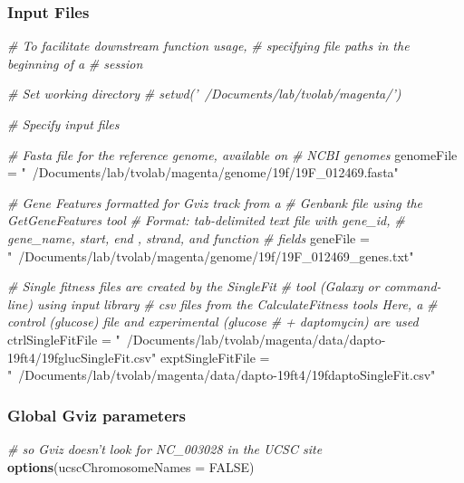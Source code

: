 \documentclass[11pt,]{article}
\newenvironment{Shaded}{\begin{snugshade}}{\end{snugshade}}
\newcommand{\KeywordTok}[1]{\textcolor[rgb]{0.13,0.29,0.53}{\textbf{{#1}}}}
\newcommand{\DataTypeTok}[1]{\textcolor[rgb]{0.13,0.29,0.53}{{#1}}}
\newcommand{\StringTok}[1]{\textcolor[rgb]{0.31,0.60,0.02}{{#1}}}
\newcommand{\CommentTok}[1]{\textcolor[rgb]{0.56,0.35,0.01}{\textit{{#1}}}}
\newcommand{\OtherTok}[1]{\textcolor[rgb]{0.56,0.35,0.01}{{#1}}}
\newcommand{\NormalTok}[1]{{#1}}
\begin{document}
\subsubsection{Input Files}\label{input-files-1}

\begin{Shaded}
\begin{Highlighting}[]
\CommentTok{# To facilitate downstream function usage,}
\CommentTok{# specifying file paths in the beginning of a}
\CommentTok{# session}

\CommentTok{# Set working directory}
\CommentTok{# setwd('~/Documents/lab/tvolab/magenta/')}

\CommentTok{# Specify input files}

\CommentTok{# Fasta file for the reference genome, available on}
\CommentTok{# NCBI genomes}
\NormalTok{genomeFile =}\StringTok{ "~/Documents/lab/tvolab/magenta/genome/19f/19F_012469.fasta"}

\CommentTok{# Gene Features formatted for Gviz track from a}
\CommentTok{# Genbank file using the GetGeneFeatures tool}
\CommentTok{# Format: tab-delimited text file with gene_id,}
\CommentTok{# gene_name, start, end , strand, and function}
\CommentTok{# fields}
\NormalTok{geneFile =}\StringTok{ "~/Documents/lab/tvolab/magenta/genome/19f/19F_012469_genes.txt"}

\CommentTok{# Single fitness files are created by the SingleFit}
\CommentTok{# tool (Galaxy or command-line) using input library}
\CommentTok{# csv files from the CalculateFitness tools Here, a}
\CommentTok{# control (glucose) file and experimental (glucose}
\CommentTok{# + daptomycin) are used}
\NormalTok{ctrlSingleFitFile =}\StringTok{ "~/Documents/lab/tvolab/magenta/data/dapto-19ft4/19fglucSingleFit.csv"}
\NormalTok{exptSingleFitFile =}\StringTok{ "~/Documents/lab/tvolab/magenta/data/dapto-19ft4/19fdaptoSingleFit.csv"}
\end{Highlighting}
\end{Shaded}

\subsubsection{Global Gviz parameters}\label{global-gviz-parameters}

\begin{Shaded}
\begin{Highlighting}[]
\CommentTok{# so Gviz doesn't look for NC_003028 in the UCSC site}
\KeywordTok{options}\NormalTok{(}\DataTypeTok{ucscChromosomeNames =} \OtherTok{FALSE}\NormalTok{)}
\end{Highlighting}
\end{Shaded}
\end{document}
